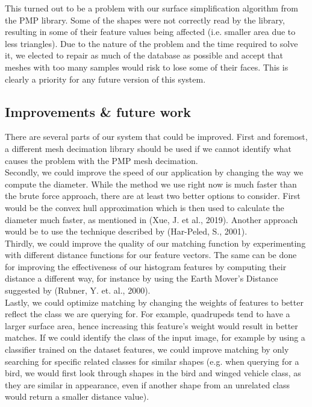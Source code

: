 \documentclass{bigdata}
\begin{document}
This turned out to be a problem with our surface simplification algorithm from the PMP library. Some of the shapes were not correctly read by the library, resulting in some of their feature values being affected (i.e. smaller area due to less triangles). Due to the nature of the problem and the time required to solve it, we elected to repair as much of the database as possible and accept that meshes with too many samples would risk to lose some of their faces. This is clearly a priority for any future version of this system.

\pagebreak

\subsection{Improvements \& future work}

There are several parts of our system that could be improved. First and foremost, a different mesh decimation library should be used if we cannot identify what causes the problem with the PMP mesh decimation. \\
Secondly, we could improve the speed of our application by changing the way we compute the diameter. While the method we use right now is much faster than the brute force approach, there are at least two better options to consider. First would be the convex hull approximation which is then used to calculate the diameter much faster, as mentioned in (Xue, J. et al., 2019). Another approach would be to use the technique described by (Har-Peled, S., 2001). \\
Thirdly, we could improve the quality of our matching function by experimenting with different distance functions for our feature vectors. The same can be done for improving the effectiveness of our histogram features by computing their distance a different way, for instance by using the Earth Mover's Distance suggested by (Rubner, Y. et. al., 2000). \\
Lastly, we could optimize matching by changing the weights of features to better reflect the class we are querying for. For example, quadrupeds tend to have a larger surface area, hence increasing this feature's weight would result in better matches. If we could identify the class of the input image, for example by using a classifier trained on the dataset features, we could improve matching by only searching for specific related classes for similar shapes (e.g. when querying for a bird, we would first look through shapes in the bird and winged vehicle class, as they are similar in appearance, even if another shape from an unrelated class would return a smaller distance value).
\end{document}
